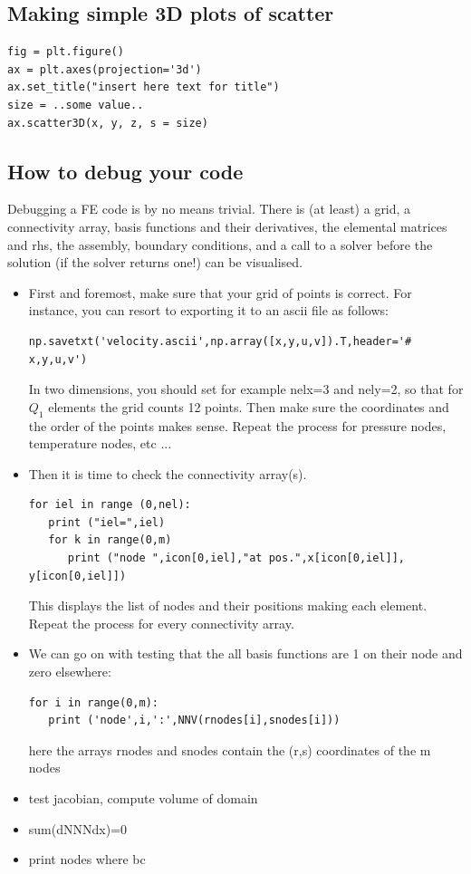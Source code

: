 \subsection{Making simple 3D plots of scatter}

\begin{lstlisting}
fig = plt.figure()
ax = plt.axes(projection='3d')
ax.set_title("insert here text for title")
size = ..some value..
ax.scatter3D(x, y, z, s = size)
\end{lstlisting}




\subsection{How to debug your code}


Debugging a FE code is by no means trivial. There is (at least) a grid, a connectivity array, basis functions and their derivatives, the elemental matrices and rhs, the assembly, boundary conditions, and a call to a solver before the solution (if the solver returns one!) can be visualised. 
\begin{itemize}
\item First and foremost, make sure that your grid of points is correct.
For instance, you can resort to exporting it to an ascii file as follows:
\begin{lstlisting}
np.savetxt('velocity.ascii',np.array([x,y,u,v]).T,header='# x,y,u,v')
\end{lstlisting}
In two dimensions, you should set for example nelx=3 and nely=2, so that 
for $Q_1$ elements the grid counts 12 points. Then make sure the coordinates and the order of the points makes sense. 
Repeat the process for pressure nodes, temperature nodes, etc ...

\item Then it is time to check the connectivity array(s). 
\begin{lstlisting}
for iel in range (0,nel):
   print ("iel=",iel)
   for k in range(0,m)
      print ("node ",icon[0,iel],"at pos.",x[icon[0,iel]], y[icon[0,iel]])
\end{lstlisting}
This displays the list of nodes and their positions making each element.
Repeat the process for every connectivity array.

\item We can go on with testing that the all basis functions are 1 on their node and  zero elsewhere:
\begin{lstlisting}
for i in range(0,m):
   print ('node',i,':',NNV(rnodes[i],snodes[i]))
\end{lstlisting}
here the arrays rnodes and snodes contain the (r,s) coordinates of the m nodes 

\item test jacobian, compute volume of domain

\item sum(dNNNdx)=0

\item print nodes where bc 

\end{itemize}

